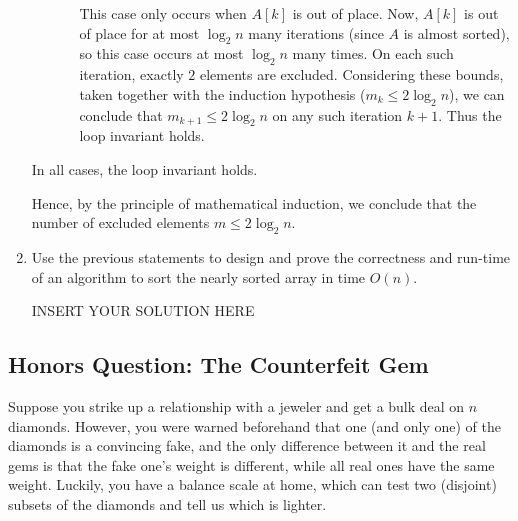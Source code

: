 \begin{enumerate}
\begin{solution}
\begin{itemize}
\begin{itemize}
This case only occurs when $A[k]$ is out of place. Now, $A[k]$ is out of place for at most $\log_2n$ many iterations (since $A$ is almost sorted), so this case occurs at most $\log_2n$ many times. On each such iteration, exactly $2$ elements are excluded. Considering these bounds, taken together with the induction hypothesis ($m_k\leq 2\log_2n$), we can conclude that $m_{k+1}\leq 2\log_2n$ on any such iteration $k+1$. Thus the loop invariant holds.
\end{itemize}
\end{itemize}
In all cases, the loop invariant holds.

Hence, by the principle of mathematical induction, we conclude that the number of excluded elements $m\leq 2\log_2n$.
\end{solution}

    
    \item Use the previous statements to design and prove the correctness and run-time of an algorithm to sort the nearly sorted array in time $O(n)$. 
    

\begin{solution}   INSERT YOUR SOLUTION HERE   \end{solution}
\end{enumerate}





    



\subsection*{Honors Question: The Counterfeit Gem}
Suppose you strike up a relationship with a jeweler and get a bulk deal on $n$ diamonds. However, you were warned beforehand that one (and only one) of the diamonds is a convincing fake, and the only difference between it and the real gems is that the fake one's weight is different, while all real ones have the same weight. Luckily, you have a balance scale at home, which can test two (disjoint) subsets of the diamonds and tell us which is lighter. 

